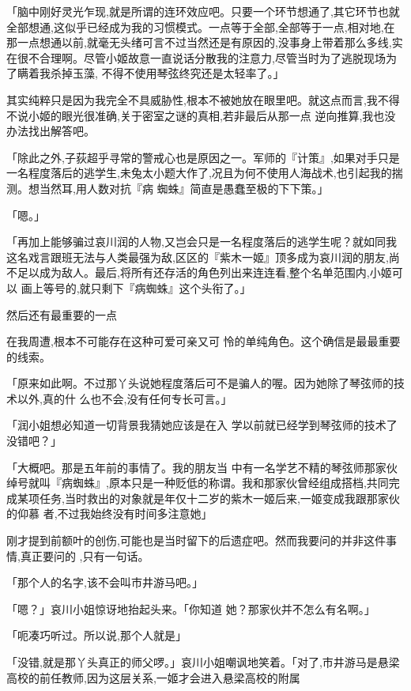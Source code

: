 \documentclass{article}
\begin{document}
\newpage

「脑中刚好灵光乍现,就是所谓的连环效应吧。只要一个环节想通了,其它环节也就全部想通,这似乎已经成为我的习惯模式。一点等于全部,全部等于一点,相对地,在那一点想通以前,就毫无头绪可言不过当然还是有原因的,没事身上带着那么多线,实在很不合理啊。尽管小姬故意一直说话分散我的注意力,尽管当时为了逃脱现场为了瞒着我杀掉玉藻,
不得不使用琴弦终究还是太轻率了。」 

其实纯粹只是因为我完全不具威胁性,根本不被她放在眼里吧。就这点而言,我不得不说小姬的眼光很准确,关于密室之谜的真相,若非最后从那一点
逆向推算,我也没办法找出解答吧。 

「除此之外,子荻超乎寻常的警戒心也是原因之一。军师的『计策』,如果对手只是一名程度落后的逃学生,未兔太小题大作了,况且为何不使用人海战术,也引起我的揣测。想当然耳,用人数对抗『病
蜘蛛』简直是愚蠢至极的下下策。」 


\newpage

「嗯。」 

「再加上能够骗过哀川润的人物,又岂会只是一名程度落后的逃学生呢？就如同我这名戏言跟班无法与人类最强为敌,区区的『紫木一姬』顶多成为哀川润的朋友,尚不足以成为敌人。最后,将所有还存活的角色列出来连连看,整个名单范围内,小姬可以
画上等号的,就只剩下『病蜘蛛』这个头衔了。」 


然后还有最重要的一点 

在我周遭,根本不可能存在这种可爱可亲又可
怜的单纯角色。这个确信是最最重要的线索。 

「原来如此啊。不过那丫头说她程度落后可不是骗人的喔。因为她除了琴弦师的技术以外,真的什
么也不会,没有任何专长可言。」 

「润小姐想必知道一切背景我猜她应该是在入
学以前就已经学到琴弦师的技术了没错吧？」 

「大概吧。那是五年前的事情了。我的朋友当
\newpage
中有一名学艺不精的琴弦师那家伙绰号就叫『病蜘蛛』,原本只是一种贬低的称谓。我和那家伙曾经组成搭档,共同完成某项任务,当时救出的对象就是年仅十二岁的紫木一姬后来,一姬变成我跟那家伙的仰慕
者,不过我始终没有时间多注意她」 

刚才提到前额叶的创伤,可能也是当时留下的后遗症吧。然而我要问的并非这件事情,真正要问的
,只有一句话。 


「那个人的名字,该不会叫市井游马吧。」 

「嗯？」哀川小姐惊讶地抬起头来。「你知道
她？那家伙并不怎么有名啊。」 


「呃凑巧听过。所以说,那个人就是」 

「没错,就是那丫头真正的师父啰。」哀川小姐嘲讽地笑着。「对了,市井游马是悬梁高校的前任教师,因为这层关系,一姬才会进入悬梁高校的附属
\end{document}
